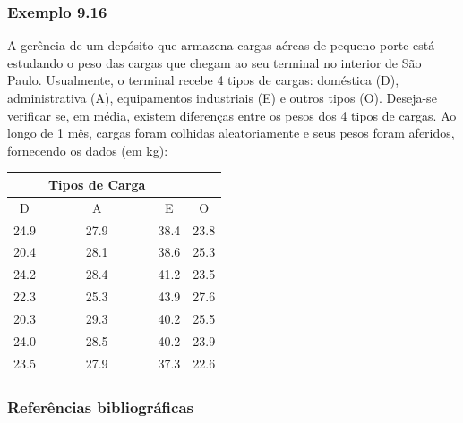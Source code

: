 \documentclass[11pt]{beamer}
\begin{document}
\begin{frame}
\frametitle{Exemplo 9.16}
A gerência de um depósito que armazena cargas aéreas de pequeno porte está estudando o peso das cargas que chegam ao seu terminal no interior de São Paulo. Usualmente, o terminal recebe 4 tipos de cargas: doméstica (D), administrativa (A), equipamentos industriais (E) e outros tipos (O). Deseja-se verificar se, em média, existem diferenças entre os pesos dos 4 tipos de cargas. Ao longo de 1 mês, cargas foram colhidas aleatoriamente e seus pesos foram aferidos, fornecendo os dados (em kg):

\begin{table}[h]
\tiny
\centering
\begin{tabular}{cccc}
\hline
& Tipos de Carga & & \\
\hline
D & A & E & O \\
24.9 & 27.9 & 38.4 & 23.8 \\
20.4 & 28.1 & 38.6 & 25.3 \\
24.2 & 28.4 & 41.2 & 23.5 \\
22.3 & 25.3 & 43.9 & 27.6 \\
20.3 & 29.3 & 40.2 & 25.5 \\
24.0 & 28.5 & 40.2 & 23.9 \\
23.5 & 27.9 & 37.3 & 22.6 \\

\hline
\end{tabular}
\end{table}
\end{frame}


\begin{frame}
\frametitle{Referências bibliográficas}
\printbibliography
\end{frame}
\end{document}
